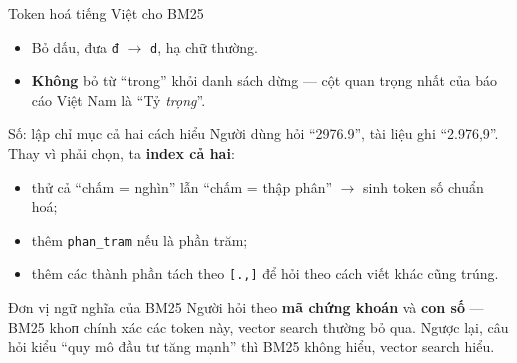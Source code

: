 \documentclass[aspectratio=169,11pt]{beamer}
\begin{document}
\begin{frame}{Token hoá tiếng Việt cho BM25}
  \begin{itemize}\small
    \item Bỏ dấu, đưa \texttt{đ} $\rightarrow$ \texttt{d}, hạ chữ thường.
    \item \textbf{Không} bỏ từ ``trong'' khỏi danh sách dừng — cột quan trọng nhất
          của báo cáo Việt Nam là ``Tỷ \emph{trọng}''.
  \end{itemize}
  \vspace{0.2em}
  \begin{block}{\small Số: lập chỉ mục cả hai cách hiểu}
    Người dùng hỏi ``2976.9'', tài liệu ghi ``2.976,9''. Thay vì phải chọn, ta
    \textbf{index cả hai}:
    \begin{itemize}\footnotesize
      \item thử cả ``chấm = nghìn'' lẫn ``chấm = thập phân'' $\rightarrow$ sinh token số chuẩn hoá;
      \item thêm \texttt{phan\_tram} nếu là phần trăm;
      \item thêm các thành phần tách theo \texttt{[.,]} để hỏi theo cách viết khác cũng trúng.
    \end{itemize}
  \end{block}
  \vspace{0.2em}
  \begin{block}{\small Đơn vị ngữ nghĩa của BM25}
    Người hỏi theo \textbf{mã chứng khoán} và \textbf{con số} — BM25 khoп chính xác
    các token này, vector search thường bỏ qua. Ngược lại, câu hỏi kiểu ``quy mô
    đầu tư tăng mạnh'' thì BM25 không hiểu, vector search hiểu.
  \end{block}
\end{frame}
\end{document}
